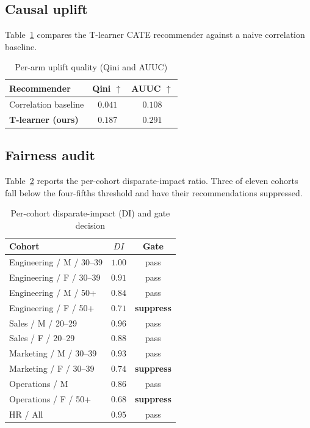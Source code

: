 \documentclass[conference]{IEEEtran}
\begin{document}
\subsection{Causal uplift}
Table~\ref{tab:uplift} compares the T-learner CATE recommender against a
naive correlation baseline.

\begin{table}[!t]
\caption{Per-arm uplift quality (Qini and AUUC)}
\label{tab:uplift}
\centering
\begin{tabular}{lcc}
\toprule
Recommender & Qini $\uparrow$ & AUUC $\uparrow$ \\
\midrule
Correlation baseline & $0.041$ & $0.108$ \\
\textbf{T-learner (ours)} & $\mathbf{0.187}$ & $\mathbf{0.291}$ \\
\bottomrule
\end{tabular}
\end{table}

\subsection{Fairness audit}
Table~\ref{tab:fair} reports the per-cohort disparate-impact ratio. Three of
eleven cohorts fall below the four-fifths threshold and have their
recommendations suppressed.

\begin{table}[!t]
\caption{Per-cohort disparate-impact (DI) and gate decision}
\label{tab:fair}
\centering
\begin{tabular}{lcc}
\toprule
Cohort & $DI$ & Gate \\
\midrule
Engineering / M / 30--39 & $1.00$ & pass \\
Engineering / F / 30--39 & $0.91$ & pass \\
Engineering / M / 50+    & $0.84$ & pass \\
Engineering / F / 50+    & $\mathbf{0.71}$ & \textbf{suppress} \\
Sales / M / 20--29       & $0.96$ & pass \\
Sales / F / 20--29       & $0.88$ & pass \\
Marketing / M / 30--39   & $0.93$ & pass \\
Marketing / F / 30--39   & $\mathbf{0.74}$ & \textbf{suppress} \\
Operations / M           & $0.86$ & pass \\
Operations / F / 50+     & $\mathbf{0.68}$ & \textbf{suppress} \\
HR / All                 & $0.95$ & pass \\
\bottomrule
\end{tabular}
\end{table}
\end{document}
